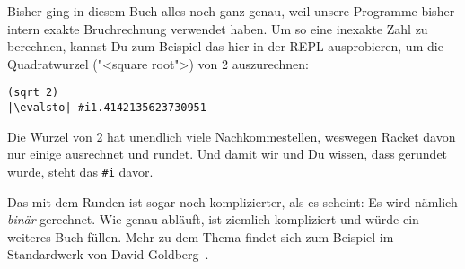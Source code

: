 Bisher ging in diesem Buch alles noch ganz genau, weil unsere
Programme bisher intern exakte Bruchrechnung verwendet haben.  Um so
eine inexakte Zahl zu berechnen, kannst Du zum Beispiel das hier in
der REPL ausprobieren, um die Quadratwurzel ("<square root">) von 2
auszurechnen:
%
\begin{lstlisting}
(sqrt 2)
|\evalsto| #i1.4142135623730951
\end{lstlisting}
%
Die Wurzel von 2 hat unendlich viele Nachkommestellen, weswegen Racket
davon nur einige ausrechnet und rundet.  Und damit wir und Du wissen,
dass gerundet wurde, steht das \lstinline{#i} davor.

Das mit dem Runden ist sogar noch komplizierter, als es scheint: Es
wird nämlich \emph{binär} gerechnet.  Wie genau abläuft, ist ziemlich
kompliziert und würde ein weiteres Buch füllen.  Mehr zu dem Thema
findet sich zum Beispiel im Standardwerk von David
Goldberg~\cite{Goldberg1991}.

